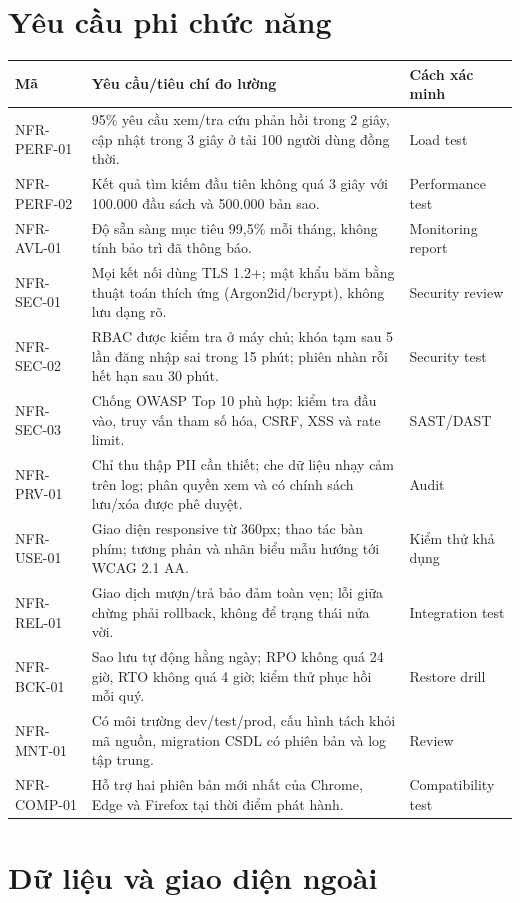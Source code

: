 \documentclass[12pt,a4paper,oneside]{report}
\begin{document}
\chapter{Yêu cầu phi chức năng}
\begin{longtable}{L{2.2cm}L{9.6cm}L{2.5cm}}
\toprule Mã & Yêu cầu/tiêu chí đo lường & Cách xác minh\\\midrule\endhead
NFR-PERF-01 & 95\% yêu cầu xem/tra cứu phản hồi trong 2 giây, cập nhật trong 3 giây ở tải 100 người dùng đồng thời. & Load test\\
NFR-PERF-02 & Kết quả tìm kiếm đầu tiên không quá 3 giây với 100.000 đầu sách và 500.000 bản sao. & Performance test\\
NFR-AVL-01 & Độ sẵn sàng mục tiêu 99,5\% mỗi tháng, không tính bảo trì đã thông báo. & Monitoring report\\
NFR-SEC-01 & Mọi kết nối dùng TLS 1.2+; mật khẩu băm bằng thuật toán thích ứng (Argon2id/bcrypt), không lưu dạng rõ. & Security review\\
NFR-SEC-02 & RBAC được kiểm tra ở máy chủ; khóa tạm sau 5 lần đăng nhập sai trong 15 phút; phiên nhàn rỗi hết hạn sau 30 phút. & Security test\\
NFR-SEC-03 & Chống OWASP Top 10 phù hợp: kiểm tra đầu vào, truy vấn tham số hóa, CSRF, XSS và rate limit. & SAST/DAST\\
NFR-PRV-01 & Chỉ thu thập PII cần thiết; che dữ liệu nhạy cảm trên log; phân quyền xem và có chính sách lưu/xóa được phê duyệt. & Audit\\
NFR-USE-01 & Giao diện responsive từ 360px; thao tác bàn phím; tương phản và nhãn biểu mẫu hướng tới WCAG 2.1 AA. & Kiểm thử khả dụng\\
NFR-REL-01 & Giao dịch mượn/trả bảo đảm toàn vẹn; lỗi giữa chừng phải rollback, không để trạng thái nửa vời. & Integration test\\
NFR-BCK-01 & Sao lưu tự động hằng ngày; RPO không quá 24 giờ, RTO không quá 4 giờ; kiểm thử phục hồi mỗi quý. & Restore drill\\
NFR-MNT-01 & Có môi trường dev/test/prod, cấu hình tách khỏi mã nguồn, migration CSDL có phiên bản và log tập trung. & Review\\
NFR-COMP-01 & Hỗ trợ hai phiên bản mới nhất của Chrome, Edge và Firefox tại thời điểm phát hành. & Compatibility test\\
\bottomrule
\end{longtable}

\chapter{Dữ liệu và giao diện ngoài}
\end{document}
